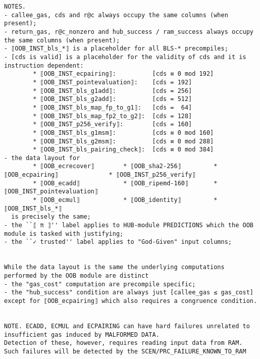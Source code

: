 \documentclass[varwidth=\maxdimen,margin=0.5cm,multi={verbatim}]{standalone}
\begin{document}
\begin{verbatim}
NOTES.
- callee_gas, cds and r@c always occupy the same columns (when present);
- return_gas, r@c_nonzero and hub_success / ram_success always occupy the same columns (when present);
- ⟦OOB_INST_bls_*⟧ is a placeholder for all BLS-* precompiles;
- [cds is valid] is a placeholder for the validity of cds and it is instruction dependent:
        * ⟦OOB_INST_ecpairing⟧:          [cds ≡ 0 mod 192]
        * ⟦OOB_INST_pointevaluation⟧:    [cds = 192]
        * ⟦OOB_INST_bls_g1add⟧:          [cds = 256]
        * ⟦OOB_INST_bls_g2add⟧:          [cds = 512]
        * ⟦OOB_INST_bls_map_fp_to_g1⟧:   [cds =  64]
        * ⟦OOB_INST_bls_map_fp2_to_g2⟧:  [cds = 128]
        * ⟦OOB_INST_p256_verify⟧:        [cds = 160]
        * ⟦OOB_INST_bls_g1msm⟧:          [cds ≡ 0 mod 160]
        * ⟦OOB_INST_bls_g2msm⟧:          [cds ≡ 0 mod 288]
        * ⟦OOB_INST_bls_pairing_check⟧:  [cds ≡ 0 mod 384]
- the data layout for
        * ⟦OOB_ecrecover⟧        * ⟦OOB_sha2-256⟧         * ⟦OOB_ecpairing⟧              * ⟦OOB_INST_p256_verify⟧
        * ⟦OOB_ecadd⟧            * ⟦OOB_ripemd-160⟧       * ⟦OOB_INST_pointevaluation⟧
        * ⟦OOB_ecmul⟧            * ⟦OOB_identity⟧         * ⟦OOB_INST_bls_*⟧
  is precisely the same;
- the ``⟦ π ⟧'' label applies to HUB-module PREDICTIONS which the OOB module is tasked with justifying;
- the ``✓ trusted'' label applies to "God-Given" input columns;


While the data layout is the same the underlying computations performed by the OOB module are distinct
- the "gas_cost" computation are precompile specific;
- the "hub_success" condition are always just [callee_gas ≤ gas_cost] except for ⟦OOB_ecpairing⟧ which also requires a congruence condition.


NOTE. ECADD, ECMUL and ECPAIRING can have hard failures unrelated to insufficient gas induced by MALFORMED DATA.
Detection of these, however, requires reading input data from RAM. Such failures will be detected by the SCEN/PRC_FAILURE_KNOWN_TO_RAM

\end{verbatim}
\end{document}
